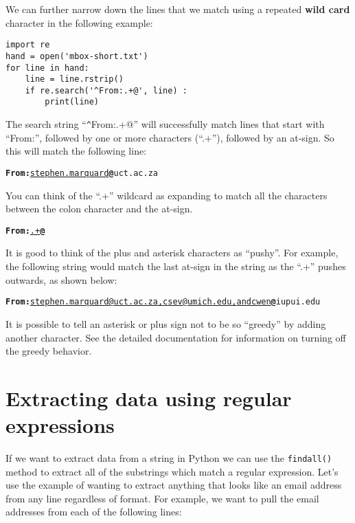We can further narrow down the lines that we match using a repeated {\bf wild card} character in
the following example:

\beforeverb
\begin{verbatim}
import re
hand = open('mbox-short.txt')
for line in hand:
    line = line.rstrip()
    if re.search('^From:.+@', line) :
        print(line)
\end{verbatim}
\afterverb
%
The search string ``\verb"^"From:.+@'' will successfully match lines that start with ``From:'',
followed by one or more characters (``.+''), followed by an at-sign.  So this will match the
following line:

\beforeverb
\begin{alltt}
{\bf From:}\underline{ stephen.marquard}{\bf @}uct.ac.za
\end{alltt}
\afterverb

You can think of the ``.+'' wildcard as expanding to match all the characters between the 
colon character and the at-sign.  

\beforeverb
\begin{alltt}
{\bf From:}\underline{.+}{\bf @}
\end{alltt}
\afterverb

It is good to think of the plus and asterisk characters as ``pushy''.  For example, the following
string would match the last at-sign in the string as the ``.+'' pushes outwards, as shown below:

\beforeverb
\begin{alltt}
{\bf From:}\underline{ stephen.marquard@uct.ac.za, csev@umich.edu, and cwen}{\bf @}iupui.edu
\end{alltt}
\afterverb

It is possible to tell an asterisk or plus sign not to be so ``greedy'' by adding 
another character.   See the detailed documentation for information on turning off the 
greedy behavior.

\section{Extracting data using regular expressions}

If we want to extract data from a string in Python we can use the {\tt findall()} method to extract
all of the substrings which match a regular expression.  Let's use the example of wanting to extract
anything that looks like an email address from any line regardless of format.  For example, we want
to pull the email addresses from each of the following lines:

